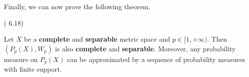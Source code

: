 
Finally, we can now prove the following theorem.

\begin{theorem}(\citet{villani2008optimal} 6.18)

  Let $X$ be a \textbf{complete} and \textbf{separable} metric space and $p \in [1,+\infty)$. Then $(P_p(X),W_p)$
  is also \textbf{complete} and \textbf{separable}. Moreover, any probability measure on
  $P_p(X)$ can be approximated by a sequence of probability measures with finite support.
\end{theorem}